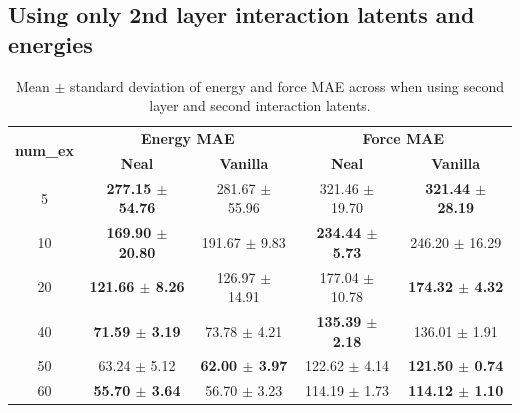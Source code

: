 \documentclass[12pt]{article}
\theoremstyle{definition}
\theoremstyle{remark}
\begin{document}
\subsection{Using only 2nd layer interaction latents and energies}
\begin{table}[h!]
\centering
\begin{tabular}{c|cc|cc}
\hline
\multirow{2}{*}{\textbf{num\_ex}} & \multicolumn{2}{c|}{\textbf{Energy MAE}} & \multicolumn{2}{c}{\textbf{Force MAE}} \\
 & \textbf{Neal} & \textbf{Vanilla} & \textbf{Neal} & \textbf{Vanilla} \\
\hline
5  & \textbf{277.15 $\pm$ 54.76} & 281.67 $\pm$ 55.96 & 321.46 $\pm$ 19.70 & \textbf{321.44 $\pm$ 28.19} \\
10 & \textbf{169.90 $\pm$ 20.80} & 191.67 $\pm$ 9.83 & \textbf{234.44 $\pm$ 5.73} & 246.20 $\pm$ 16.29 \\
20 & \textbf{121.66 $\pm$ 8.26} & 126.97 $\pm$ 14.91 & 177.04 $\pm$ 10.78 & \textbf{174.32 $\pm$ 4.32} \\
40 & \textbf{71.59 $\pm$ 3.19} & 73.78 $\pm$ 4.21 & \textbf{135.39 $\pm$ 2.18} & 136.01 $\pm$ 1.91 \\
50 & 63.24 $\pm$ 5.12 & \textbf{62.00 $\pm$ 3.97} & 122.62 $\pm$ 4.14 & \textbf{121.50 $\pm$ 0.74} \\
60 & \textbf{55.70 $\pm$ 3.64} & 56.70 $\pm$ 3.23 & 114.19 $\pm$ 1.73 & \textbf{114.12 $\pm$ 1.10} \\
\hline
\end{tabular}
\caption{Mean $\pm$ standard deviation of energy and force MAE across when using second layer and second interaction latents.}
\label{tab:energy_force_mae}
\end{table}
\end{document}
